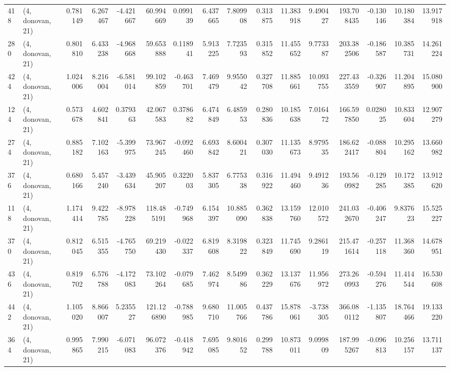 \begin{tabular}{llrrrrrrrrrrrrrr}
418 &  (4, donovan, 21) &   0.781149 &   6.267467 &  -4.421667 &    60.994669 &   0.099139 &   6.437665 &   7.809908 &  0.313875 &  11.383918 &   9.490427 &   193.708435 &  -0.130146 &  10.180384 &  13.917918 \\
280 &  (4, donovan, 21) &   0.801810 &   6.433238 &  -4.968668 &    59.653888 &   0.118941 &   5.913225 &   7.723593 &  0.315852 &  11.455652 &   9.773387 &   203.382506 &  -0.186587 &  10.385731 &  14.261224 \\
424 &  (4, donovan, 21) &   1.024006 &   8.216004 &  -6.581014 &    99.102859 &  -0.463701 &   7.469479 &   9.955042 &  0.327708 &  11.885661 &  10.093755 &   227.433559 &  -0.326907 &  11.204895 &  15.080900 \\
124 &  (4, donovan, 21) &   0.573678 &   4.602841 &   0.379363 &    42.067583 &   0.378682 &   6.474849 &   6.485953 &  0.280836 &  10.185638 &   7.016472 &   166.597850 &   0.028025 &  10.833604 &  12.907279 \\
274 &  (4, donovan, 21) &   0.885182 &   7.102163 &  -5.399975 &    73.967245 &  -0.092460 &   6.693842 &   8.600421 &  0.307030 &  11.135673 &   8.979535 &   186.622417 &  -0.088804 &  10.295162 &  13.660982 \\
376 &  (4, donovan, 21) &   0.680166 &   5.457240 &  -3.439634 &    45.905207 &   0.322003 &   5.837305 &   6.775338 &  0.316922 &  11.494460 &   9.491236 &   193.560982 &  -0.129285 &  10.172385 &  13.912620 \\
118 &  (4, donovan, 21) &   1.174414 &   9.422785 &  -8.978228 &   118.485191 &  -0.749968 &   6.154397 &  10.885090 &  0.362838 &  13.159760 &  12.010572 &   241.032670 &  -0.406247 &   9.837623 &  15.525227 \\
370 &  (4, donovan, 21) &   0.812045 &   6.515355 &  -4.765750 &    69.219430 &  -0.022337 &   6.819608 &   8.319822 &  0.323849 &  11.745690 &   9.286119 &   215.471614 &  -0.257118 &  11.368360 &  14.678951 \\
436 &  (4, donovan, 21) &   0.819702 &   6.576788 &  -4.172083 &    73.102264 &  -0.079685 &   7.462974 &   8.549986 &  0.362229 &  13.137676 &  11.956972 &   273.260993 &  -0.594276 &  11.414544 &  16.530608 \\
442 &  (4, donovan, 21) &   1.105020 &   8.866007 &   5.235527 &   121.126890 &  -0.788985 &   9.680710 &  11.005766 &  0.437786 &  15.878061 &  -3.738305 &   366.080112 &  -1.135807 &  18.764466 &  19.133220 \\
364 &  (4, donovan, 21) &   0.995865 &   7.990215 &  -6.071083 &    96.072376 &  -0.418942 &   7.695085 &   9.801652 &  0.299788 &  10.873011 &   9.099809 &   187.995267 &  -0.096813 &  10.256157 &  13.711137 \\

\end{tabular}
